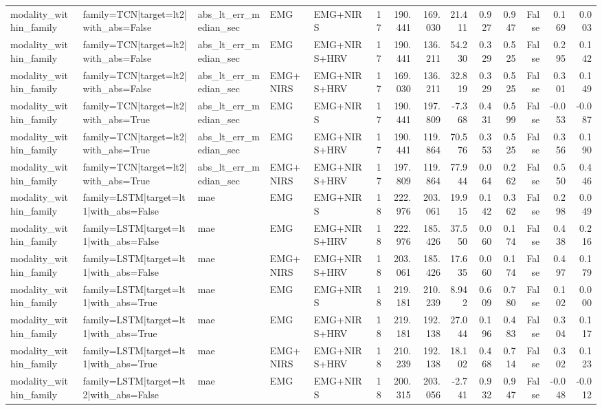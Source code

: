 \begin{table}
\begin{tabular}{lllllrrrrrrrrr}
modality_within_family & family=TCN|target=lt2|with_abs=False & abs_lt_err_median_sec & EMG & EMG+NIRS & 17 & 190.441 & 169.030 & 21.411 & 0.927 & 0.947 & False & 0.169 & 0.003 \\
modality_within_family & family=TCN|target=lt2|with_abs=False & abs_lt_err_median_sec & EMG & EMG+NIRS+HRV & 17 & 190.441 & 136.211 & 54.230 & 0.329 & 0.525 & False & 0.295 & 0.142 \\
modality_within_family & family=TCN|target=lt2|with_abs=False & abs_lt_err_median_sec & EMG+NIRS & EMG+NIRS+HRV & 17 & 169.030 & 136.211 & 32.819 & 0.329 & 0.525 & False & 0.301 & 0.149 \\
modality_within_family & family=TCN|target=lt2|with_abs=True & abs_lt_err_median_sec & EMG & EMG+NIRS & 17 & 190.441 & 197.809 & -7.368 & 0.431 & 0.599 & False & -0.053 & -0.087 \\
modality_within_family & family=TCN|target=lt2|with_abs=True & abs_lt_err_median_sec & EMG & EMG+NIRS+HRV & 17 & 190.441 & 119.864 & 70.576 & 0.353 & 0.525 & False & 0.356 & 0.190 \\
modality_within_family & family=TCN|target=lt2|with_abs=True & abs_lt_err_median_sec & EMG+NIRS & EMG+NIRS+HRV & 17 & 197.809 & 119.864 & 77.944 & 0.064 & 0.262 & False & 0.550 & 0.446 \\
modality_within_family & family=LSTM|target=lt1|with_abs=False & mae & EMG & EMG+NIRS & 18 & 222.976 & 203.061 & 19.915 & 0.142 & 0.362 & False & 0.298 & 0.049 \\
modality_within_family & family=LSTM|target=lt1|with_abs=False & mae & EMG & EMG+NIRS+HRV & 18 & 222.976 & 185.426 & 37.550 & 0.060 & 0.174 & False & 0.438 & 0.216 \\
modality_within_family & family=LSTM|target=lt1|with_abs=False & mae & EMG+NIRS & EMG+NIRS+HRV & 18 & 203.061 & 185.426 & 17.635 & 0.060 & 0.174 & False & 0.497 & 0.179 \\
modality_within_family & family=LSTM|target=lt1|with_abs=True & mae & EMG & EMG+NIRS & 18 & 219.181 & 210.239 & 8.942 & 0.609 & 0.780 & False & 0.102 & 0.000 \\
modality_within_family & family=LSTM|target=lt1|with_abs=True & mae & EMG & EMG+NIRS+HRV & 18 & 219.181 & 192.138 & 27.044 & 0.196 & 0.483 & False & 0.304 & 0.117 \\
modality_within_family & family=LSTM|target=lt1|with_abs=True & mae & EMG+NIRS & EMG+NIRS+HRV & 18 & 210.239 & 192.138 & 18.102 & 0.468 & 0.714 & False & 0.302 & 0.123 \\
modality_within_family & family=LSTM|target=lt2|with_abs=False & mae & EMG & EMG+NIRS & 18 & 200.315 & 203.056 & -2.741 & 0.932 & 0.947 & False & -0.048 & -0.012 \\

\end{tabular}
\end{table}
